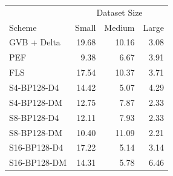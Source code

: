 \begin{tabular}{lrrr}
\toprule
 & \multicolumn{3}{c}{Dataset Size} \\
Scheme & Small & Medium & Large \\
\midrule
GVB + Delta & 19.68 & 10.16 & 3.08 \\
PEF & 9.38 & 6.67 & 3.91 \\
FLS & 17.54 & 10.37 & 3.71 \\
S4-BP128-D4 & 14.42 & 5.07 & 4.29 \\
S4-BP128-DM & 12.75 & 7.87 & 2.33 \\
S8-BP128-D4 & 12.11 & 7.93 & 2.33 \\
S8-BP128-DM & 10.40 & 11.09 & 2.21 \\
S16-BP128-D4 & 17.22 & 5.14 & 3.14 \\
S16-BP128-DM & 14.31 & 5.78 & 6.46 \\
\bottomrule
\end{tabular}
